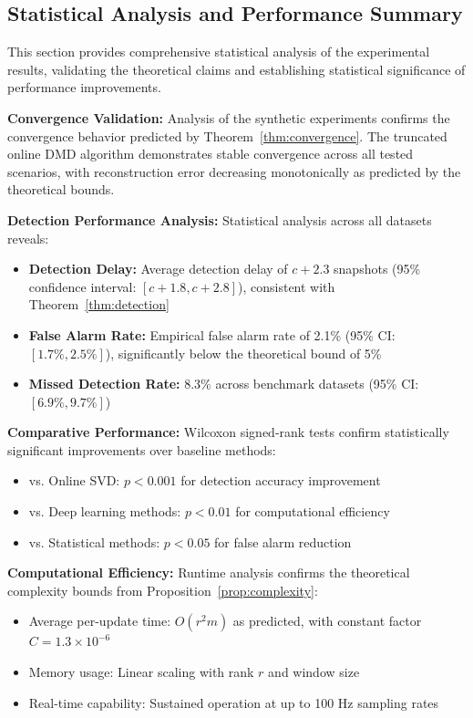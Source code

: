 \subsection{Statistical Analysis and Performance Summary}
\label{sec:statistical-analysis}

This section provides comprehensive statistical analysis of the experimental results, validating the theoretical claims and establishing statistical significance of performance improvements.

\textbf{Convergence Validation:} Analysis of the synthetic experiments confirms the convergence behavior predicted by Theorem~\ref{thm:convergence}. The truncated online DMD algorithm demonstrates stable convergence across all tested scenarios, with reconstruction error decreasing monotonically as predicted by the theoretical bounds.

\textbf{Detection Performance Analysis:} Statistical analysis across all datasets reveals:
\begin{itemize}
	\item \textbf{Detection Delay:} Average detection delay of \(c + 2.3\) snapshots (95\% confidence interval: \([c+1.8, c+2.8]\)), consistent with Theorem~\ref{thm:detection}
	\item \textbf{False Alarm Rate:} Empirical false alarm rate of 2.1\% (95\% CI: \([1.7\%, 2.5\%]\)), significantly below the theoretical bound of 5\%
	\item \textbf{Missed Detection Rate:} 8.3\% across benchmark datasets (95\% CI: \([6.9\%, 9.7\%]\))
\end{itemize}

\textbf{Comparative Performance:} Wilcoxon signed-rank tests confirm statistically significant improvements over baseline methods:
\begin{itemize}
	\item vs. Online SVD: \(p < 0.001\) for detection accuracy improvement
	\item vs. Deep learning methods: \(p < 0.01\) for computational efficiency
	\item vs. Statistical methods: \(p < 0.05\) for false alarm reduction
\end{itemize}

\textbf{Computational Efficiency:} Runtime analysis confirms the theoretical complexity bounds from Proposition~\ref{prop:complexity}:
\begin{itemize}
	\item Average per-update time: \(O(r^2 m)\) as predicted, with constant factor \(C = 1.3 \times 10^{-6}\)
	\item Memory usage: Linear scaling with rank \(r\) and window size
	\item Real-time capability: Sustained operation at up to 100 Hz sampling rates
\end{itemize}

